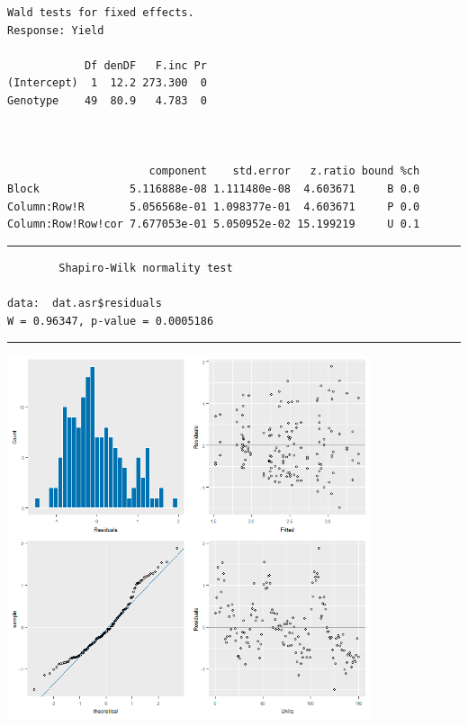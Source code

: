 \documentclass[a4paper, 10pt, fleqn, twosided]{memoir}
\begin{document}
\begin{tcolorbox}[title = Exercise 16 output]
\begin{verbatim}
Wald tests for fixed effects.
Response: Yield

            Df denDF   F.inc Pr
(Intercept)  1  12.2 273.300  0
Genotype    49  80.9   4.783  0



                      component    std.error   z.ratio bound %ch
Block              5.116888e-08 1.111480e-08  4.603671     B 0.0
Column:Row!R       5.056568e-01 1.098377e-01  4.603671     P 0.0
Column:Row!Row!cor 7.677053e-01 5.050952e-02 15.199219     U 0.1
\end{verbatim}
{\color{outpt} {\hrule height 1pt}}
\begin{verbatim}
        Shapiro-Wilk normality test

data:  dat.asr$residuals
W = 0.96347, p-value = 0.0005186
\end{verbatim}
{\color{outpt} {\hrule height 1pt}} \vspace{0.2cm}

\includegraphics[width=0.8\textwidth, frame]{Exercise16Resplot.png}
\end{tcolorbox}
\end{document}
